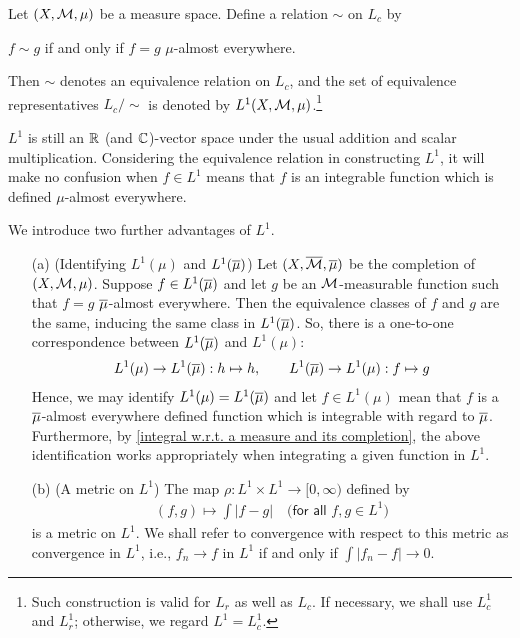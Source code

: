 \begin{defi}[$L^1$ space]
    Let $(X, {\mathcal{M}}, \mu)$ be a measure space.
    Define a relation $\sim$ on $L_c$ by
    \begin{center}
        $f\sim g$ if and only if $f=g$ $\mu$-almost everywhere.
    \end{center}
    Then $\sim$ denotes an equivalence relation on $L_c$, and the set of equivalence representatives $L_c/\sim$ is denoted by $L^1(X, {\mathcal{M}}, \mu)$.\footnote{Such construction is valid for $L_r$ as well as $L_c$. If necessary, we shall use $L_c^1$ and $L_r^1$; otherwise, we regard $L^1=L_c^1$.}
\end{defi}
\begin{rmk}
    $L^1$ is still an ${\mathbb{R}}$ (and ${\mathbb{C}}$)-vector space under the usual addition and scalar multiplication.
    Considering the equivalence relation in constructing $L^1$, it will make no confusion when $f\in L^1$ means that $f$ is an integrable function which is defined $\mu$-almost everywhere.

    We introduce two further advantages of $L^1$.
    \begin{enumerate}
        \item[(a)]
        {
            (Identifying $L^1(\mu)$ and $L^1(\overline{\mu})$)
            Let $(X, \overline{{\mathcal{M}}}, \overline{\mu})$ be the completion of $(X, {\mathcal{M}}, \mu)$.
            Suppose $f\in L^1(\overline{\mu})$ and let $g$ be an ${\mathcal{M}}$-measurable function such that $f=g$ $\overline{\mu}$-almost everywhere.
            Then the equivalence classes of $f$ and $g$ are the same, inducing the same class in $L^1(\overline{\mu})$.
            So, there is a one-to-one correspondence between $L^1(\overline{\mu})$ and $L^1(\mu)$:
            \begin{align*}
                L^1(\mu)\rightarrow L^1(\overline{\mu}): h\mapsto h,\qquad
                L^1(\overline{\mu})\rightarrow L^1(\mu): f\mapsto g
            \end{align*}
            Hence, we may identify $L^1(\mu)=L^1(\overline{\mu})$ and let $f\in L^1(\mu)$ mean that $f$ is a $\overline{\mu}$-almost everywhere defined function which is integrable with regard to $\overline{\mu}$.
            Furthermore, by \cref{integral w.r.t. a measure and its completion}, the above identification works appropriately when integrating a given function in $L^1$.
        }
        \item[(b)]
        {
            (A metric on $L^1$)
            The map $\rho: L^1\times L^1\rightarrow[0, \infty)$ defined by
            \begin{align*}
                (f, g)\mapsto\int|f-g|\quad\textsf{(for all $f, g\in L^1$)}
            \end{align*}
            is a metric on $L^1$.
            We shall refer to convergence with respect to this metric as convergence in $L^1$, i.e., $f_n\rightarrow f$ in $L^1$ if and only if $\int|f_n-f|\rightarrow 0$.
        }
    \end{enumerate}
\end{rmk}

